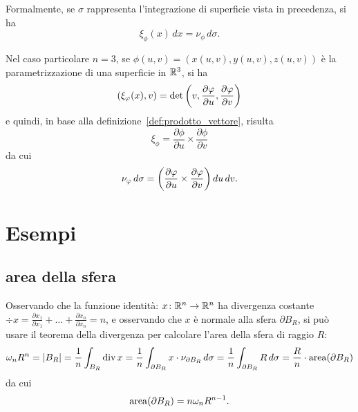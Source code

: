 Formalmente, se $\sigma$ rappresenta l'integrazione di superficie vista in precedenza, 
si ha
\[
  \xi_\phi(x) \, dx = \nu_\phi\, d\sigma.
\]

Nel caso particolare $n=3$, se $\phi(u,v) = (x(u,v), y(u,v), z(u,v))$ è la 
parametrizzazione di una superficie in ${\mathbb R}^3$, si ha 
\[
  (\xi_\varphi(x),v)  = \det{\left( v, \frac{\partial \varphi}{\partial u}, \frac{\partial \varphi}{\partial v} \right)}
\]
e quindi, in base alla definizione~\ref{def:prodotto_vettore},
risulta
\[
  \xi_\phi = \frac{\partial \phi}{\partial u} \times \frac{\partial \phi}{\partial v}
\]
da cui
\[
  \nu_\varphi\, d\sigma = {\left( \frac{\partial \varphi}{\partial u} \times \frac{\partial \varphi}{\partial v} \right)}\, du\, dv.
\]

\section{Esempi}

\subsection{area della sfera}

Osservando che la funzione identità: $x\colon {\mathbb R}^n\to {\mathbb R}^n$ 
ha divergenza costante 
$\div x = \frac{\partial x_1}{\partial x_1} + \dots + \frac{\partial x_n}{\partial x_n} = n$,
e osservando che $x$ è normale alla sfera $\partial B_R$, 
si può usare il teorema della divergenza per calcolare l'area della sfera di raggio $R$:
\[
\omega_n R^n = {\left|B_R\right|} 
  = \frac 1 n \int_{B_R} \operatorname{div} x
  = \frac 1 n \int_{\partial B_R} x \cdot \nu_{\partial B_R}\, d\sigma
  = \frac 1 n \int_{\partial B_R} R\, d\sigma
  = \frac{R}{n} \cdot \operatorname{area}(\partial B_R)
\]
da cui
\begin{equation}\label{eq:area_sfera}
  \operatorname{area}(\partial B_R) 
  = n \omega_n R^{n-1}.
\end{equation}

